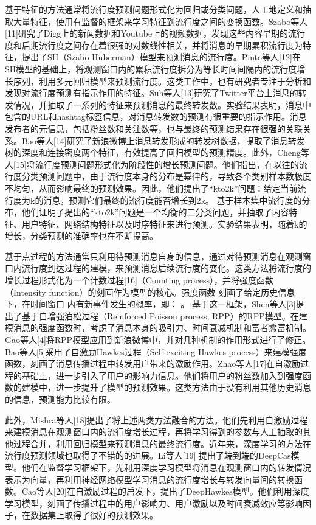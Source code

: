 基于特征的方法通常将流行度预测问题形式化为回归或分类问题，人工地定义和抽取大量特征，使用有监督的框架来学习特征到流行度之间的变换函数。Szabo等人[11]研究了Digg上的新闻数据和Youtube上的视频数据，发现这些内容早期的流行度和后期流行度之间存在着很强的对数线性相关，并将消息的早期累积流行度为特征，提出了SH（Szabo-Huberman）模型来预测消息的流行度。Pinto等人[12]在SH模型的基础上，将观测窗口内的累积流行度拆分为等长时间间隔内的流行度增长序列，利用多元回归模型来预测流行度。这类工作中，也有研究者专注于分析和发现对流行度预测有指示作用的特征。Suh等人[13]研究了Twitter平台上消息的转发情况，并抽取了一系列的特征来预测消息的最终转发数。实验结果表明，消息中包含的URL和hashtag标签信息，对消息转发数的预测有很重要的指示作用。消息发布者的元信息，包括粉丝数和关注数等，也与最终的预测结果存在很强的关联关系。Bao等人[14]研究了新浪微博上消息转发形成的转发树数据，提取了消息转发树的深度和连接密度两个特征，有效提高了回归模型的预测精度。此外，Cheng等人[15]将流行度预测问题形式化为阶段性的增长预测问题。他们指出，在以往的流行度分类预测问题中，由于流行度本身的分布是幂律的，导致各个类别样本数极度不均匀，从而影响最终的预测效果。因此，他们提出了“kto2k”问题：给定当前流行度为k的消息，预测它们最终的流行度能否增长到2k。 基于样本集中流行度的分布，他们证明了提出的“kto2k”问题是一个均衡的二分类问题，并抽取了内容特征、用户特征、网络结构特征以及时序特征来进行预测。实验结果表明，随着k的增长，分类预测的准确率也在不断提高。

基于点过程的方法通常只利用待预测消息自身的信息，通过对待预测消息在观测窗口内流行度到达过程的建模，来预测消息后续流行度的变化。这类方法将流行度的增长过程形式化为一个计数过程[16]（Counting process），并将强度函数（Intensity function）的刻画作为模型的核心。强度函数 刻画了给定历史信息 下，在时间窗口 内有新事件发生的概率，即：
 。
基于这一框架，Shen等人[3]提出了基于自增强泊松过程（Reinforced Poisson process, RPP）的RPP模型。在建模消息的强度函数时，考虑了消息本身的吸引力、时间衰减机制和富者愈富机制。Gao等人[4]将RPP模型应用到新浪微博中，并对几种机制的作用形式进行了修正。Bao等人[5]采用了自激励Hawkes过程（Self-exciting Hawkes process）来建模强度函数，刻画了消息传播过程中转发用户带来的激励作用。Zhao等人[17]在自激励过程的基础上，进一步引入了用户的影响力信息。他们将用户的粉丝数加入到强度函数的建模中，进一步提升了模型的预测效果。这类方法由于没有利用其他历史消息的信息，预测能力比较有限。

此外，Mishra等人[18]提出了将上述两类方法融合的方法。他们先利用自激励过程来建模消息在观测窗口内的流行度增长过程，再将学习得到的参数与人工抽取的其他过程合并，利用回归模型来预测消息的最终流行度。近年来，深度学习的方法在流行度预测领域也取得了不错的的进展。Li等人[19] 提出了端到端的DeepCas模型。他们在监督学习框架下，先利用深度学习模型将消息在观测窗口内的转发情况表示为向量，再利用神经网络模型学习消息的流行度增长与转发向量间的转换函数。Cao等人[20]在自激励过程的启发下，提出了DeepHawkes模型。他们利用深度学习模型，刻画了传播过程中的用户影响力、用户激励以及时间衰减效应等影响因子，在数据集上取得了很好的预测效果。


